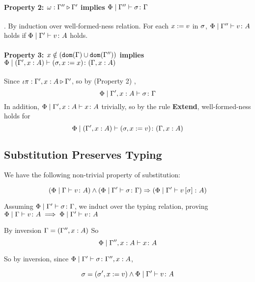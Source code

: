 {        \paragraph{Property 2: $\omega : \Gamma'' \triangleright \Gamma'$ implies $\Phi\mid\Gamma'' \vdash \sigma \colon \Gamma$}. 
        By induction over well-formed-ness relation. For each $x:= v$ in $\sigma$, $\Phi\mid\Gamma'' \vdash v \colon A$ holds if $\Phi\mid\Gamma' \vdash v \colon A$ holds.
        \paragraph{Property 3: $x \notin (\texttt{dom}(\Gamma) \cup \texttt{dom}(\Gamma''))$ implies $\Phi\mid(\Gamma', x: A) \vdash (\sigma, x := x) \colon (\Gamma, x: A)$} 
        Since $\iota\pi : \Gamma',x: A \triangleright \Gamma'$, so by (Property 2) , 
        $$\Phi\mid\Gamma', x: A \vdash \sigma \colon \Gamma$$
        In addition, $\Phi\mid\Gamma', x: A \vdash x \colon A$ trivially, so by the rule \textbf{Extend}, well-formed-ness holds for
        \begin{equation}
            \Phi\mid(\Gamma', x:A) \vdash (\sigma, x:= v) \colon (\Gamma, x: A)
        \end{equation}
    

    \subsection{Substitution Preserves Typing}
    We have the following non-trivial property of substitution:

    \begin{equation}
        (\Phi\mid\Gamma \vdash v \colon A)\wedge(\Phi\mid\Gamma' \vdash \sigma \colon \Gamma)\Rightarrow(\Phi\mid\Gamma' \vdash v\left[\sigma\right] \colon A)
    \end{equation}

    Assuming $\Phi\mid\Gamma' \vdash \sigma \colon \Gamma$, we induct over the typing relation, proving $\Phi\mid\Gamma \vdash v \colon A\implies\Phi\mid\Gamma' \vdash v \colon A$

    \proof
            By inversion $\Gamma = (\Gamma'', x:A)$
            So \begin{equation}
                \Phi\mid\Gamma'',x:A \vdash x \colon A
            \end{equation}

            So by inversion, since $\Phi\mid\Gamma' \vdash \sigma \colon \Gamma'', x:A$, 

            \begin{equation}
                \sigma = (\sigma', x:= v) \wedge \Phi\mid\Gamma' \vdash v \colon A
            \end{equation}

}
